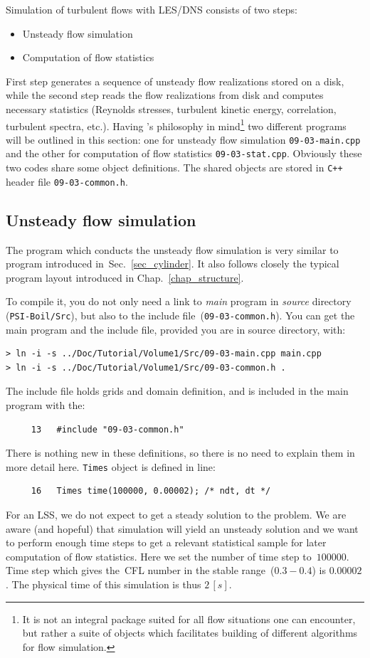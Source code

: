 Simulation of turbulent flows with LES/DNS consists of two steps:
%
\begin{itemize}
  \item Unsteady flow simulation
  \item Computation of flow statistics
\end{itemize}
%
First step generates a sequence of unsteady flow realizations stored on
a disk, while the second step reads the flow realizations from disk and
computes necessary statistics (Reynolds stresses, turbulent kinetic
energy, correlation, turbulent spectra, etc.). Having {\psiboil}'s
philosophy in mind\footnote{It is not an integral package suited for 
all flow situations one can encounter, but rather a suite of objects which 
facilitates building of different algorithms for flow simulation.} two
different programs will be outlined in this section: one for
unsteady flow simulation {\tt 09-03-main.cpp} and the other for
computation of flow statistics {\tt 09-03-stat.cpp}. Obviously these
two codes share some object definitions. The shared objects are stored
in {\tt C++} header file {\tt 09-03-common.h}.

\subsection{Unsteady flow simulation}
\label{sub_sec_unsteady_flow}

The program which conducts the unsteady flow simulation is very similar
to program introduced in~Sec.~\ref{sec_cylinder}. It also follows 
closely the typical {\psiboil} program layout introduced in Chap.~\ref{chap_structure}.

To compile it, you do not only need a link to {\em main} program in
{\em source} directory ({\tt PSI-Boil/Src}), but also to the include 
file~({\tt 09-03-common.h}). You can get the main program and the include 
file, provided you are in source directory, with:
%
\begin{verbatim}
> ln -i -s ../Doc/Tutorial/Volume1/Src/09-03-main.cpp main.cpp
> ln -i -s ../Doc/Tutorial/Volume1/Src/09-03-common.h .
\end{verbatim} 
%
The include file holds grids and domain definition, and is included in the 
main program with the:
%
{\small \begin{verbatim}
     13   #include "09-03-common.h"
\end{verbatim}}
%
There is nothing new in these definitions, so there is no need to
explain them in more detail here. {\tt Times} object is defined in
line:
%
{\small \begin{verbatim}
     16   Times time(100000, 0.00002); /* ndt, dt */
\end{verbatim}}
%
For an LSS, we do not expect to get a steady solution to the problem.
We are aware (and hopeful) that simulation will yield an unsteady
solution and we want to perform enough time steps to get a relevant
statistical sample for later computation of flow statistics. Here 
we set the number of time step to~$100000$. Time step which gives 
the~CFL number in the stable range~($0.3-0.4$) is $0.00002$. The
physical time of this simulation is thus $2 \, [s]$.

